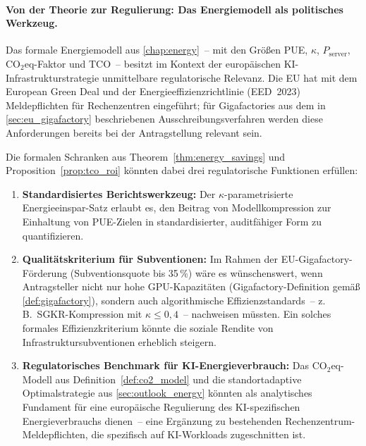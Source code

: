 \documentclass[12pt, a4paper, openany]{report}
\begin{document}
\paragraph{Von der Theorie zur Regulierung: Das Energiemodell als
  politisches Werkzeug.}
Das formale Energiemodell aus \cref{chap:energy}~-- mit den Größen
PUE, $\kappa$, $P_{\mathrm{server}}$, CO$_2$eq-Faktor und TCO~--
besitzt im Kontext der europäischen KI-Infrastrukturstrategie
unmittelbare regulatorische Relevanz.  Die EU hat mit dem European
Green Deal und der Energieeffizienzrichtlinie (EED~2023) Meldepflichten
für Rechenzentren eingeführt; für Gigafactories aus dem in
\cref{sec:eu_gigafactory} beschriebenen Ausschreibungsverfahren werden
diese Anforderungen bereits bei der Antragstellung relevant sein.

Die formalen Schranken aus Theorem~\ref{thm:energy_savings} und
Proposition~\ref{prop:tco_roi} könnten dabei drei regulatorische
Funktionen erfüllen:
\begin{enumerate}[label=(\roman*)]
  \item \textbf{Standardisiertes Berichtswerkzeug:} Der
    $\kappa$-parametrisierte Energieeinspar-Satz erlaubt es, den
    Beitrag von Modellkompression zur Einhaltung von PUE-Zielen in
    standardisierter, auditfähiger Form zu quantifizieren.
  \item \textbf{Qualitätskriterium für Subventionen:} Im Rahmen der
    EU-Gigafactory-Förderung (Subventionsquote bis 35\,\%) wäre es
    wünschenswert, wenn Antragsteller nicht nur hohe GPU-Kapazitäten
    (Gigafactory-Definition gemäß \cref{def:gigafactory}), sondern auch
    algorithmische Effizienzstandards~-- z.\,B.\ SGKR-Kompression mit
    $\kappa \leq 0{,}4$~-- nachweisen müssten.  Ein solches formales
    Effizienzkriterium könnte die soziale Rendite von
    Infrastruktursubventionen erheblich steigern.
  \item \textbf{Regulatorisches Benchmark für KI-Energieverbrauch:}
    Das CO$_2$eq-Modell aus Definition~\ref{def:co2_model} und die
    standortadaptive Optimalstrategie aus \cref{sec:outlook_energy}
    könnten als analytisches Fundament für eine europäische
    Regulierung des KI-spezifischen Energieverbrauchs dienen~-- eine
    Ergänzung zu bestehenden Rechenzentrum-Meldepflichten, die
    spezifisch auf KI-Workloads zugeschnitten ist.
\end{enumerate}
\end{document}
